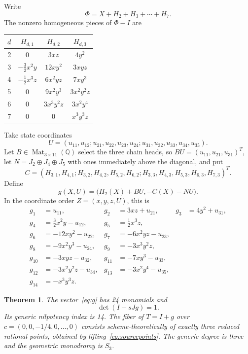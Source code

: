 \documentclass[11pt]{article}
\newtheorem{theorem}{Theorem}
\newcommand{\Q}{\mathbb Q}
\begin{document}
Write
\begin{equation}
 \Phi=X+H_2+H_3+\cdots+H_7.
\end{equation}
The nonzero homogeneous pieces of $\Phi-I$ are
\begin{center}
\begin{tabular}{c|ccc}
\toprule
$d$&$H_{d,1}$&$H_{d,2}$&$H_{d,3}$\\
\midrule
2&0&$3xz$&$4y^2$\\
3&$-\tfrac32x^2y$&$12xy^2$&$3xyz$\\
4&$-\tfrac12x^3z$&$6x^2yz$&$7xy^3$\\
5&0&$9x^2y^3$&$3x^2y^2z$\\
6&0&$3x^3y^2z$&$3x^2y^4$\\
7&0&0&$x^3y^3z$\\
\bottomrule
\end{tabular}
\end{center}

Take state coordinates
\[
 U=(u_{11},u_{12};u_{21},u_{22},u_{23},u_{24};
 u_{31},u_{32},u_{33},u_{34},u_{35}).
\]
Let $B\in\operatorname{Mat}_{3\times11}(\Q)$ select the three chain heads,
so $BU=(u_{11},u_{21},u_{31})^T$, let
$N=J_2\oplus J_4\oplus J_5$ with ones immediately above the diagonal, and
put
\[
C=(H_{3,1},H_{4,1};H_{3,2},H_{4,2},H_{5,2},H_{6,2};
H_{3,3},H_{4,3},H_{5,3},H_{6,3},H_{7,3})^T.
\]
Define
\begin{equation}
 g(X,U)=\bigl(H_2(X)+BU,-C(X)-NU\bigr).
 \label{eq:blockg}
\end{equation}
In the coordinate order $Z=(x,y,z,U)$, this is
\begin{align}
g_1&=u_{11},&
g_2&=3xz+u_{21},&
g_3&=4y^2+u_{31},\nonumber\\
g_4&=\tfrac32x^2y-u_{12},&
g_5&=\tfrac12x^3z,\nonumber\\
g_6&=-12xy^2-u_{22},&
g_7&=-6x^2yz-u_{23},\nonumber\\
g_8&=-9x^2y^3-u_{24},&
g_9&=-3x^3y^2z,\nonumber\\
g_{10}&=-3xyz-u_{32},&
g_{11}&=-7xy^3-u_{33},\nonumber\\
g_{12}&=-3x^2y^2z-u_{34},&
g_{13}&=-3x^2y^4-u_{35},\nonumber\\
g_{14}&=-x^3y^3z.\label{eq:g}
\end{align}

\begin{theorem}\label{thm:g14}
The vector~\eqref{eq:g} has 24 monomials and
\[
 \det(I+sJg)=1.
\]
Its generic nilpotency index is 14.  The fiber of $T=I+g$ over
$c=(0,0,-1/4,0,\ldots,0)$ consists scheme-theoretically of exactly three
reduced rational points, obtained by lifting~\eqref{eq:sourcepoints}.
The generic degree is three and the geometric monodromy is $S_3$.
\end{theorem}
\end{document}
